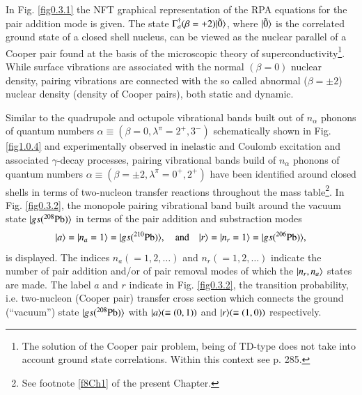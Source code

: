  In Fig. \ref{fig0.3.1} the NFT graphical representation of the RPA equations for the pair addition mode is given. The state $\Gamma^\dagger_a(\beta=+2)|{\tilde 0} \rangle$, where $|{\tilde 0} \rangle$ is the correlated ground state of a closed shell nucleus, can be viewed as the nuclear parallel of a Cooper pair found at the basis of the microscopic theory of superconductivity\footnote{\label{f25Ch1} The solution of the Cooper pair problem, being of TD-type does not take into account ground state correlations. Within this context see \cite{Ambegaokar:69} p. 285.}.
While surface vibrations are associated with the normal $(\beta=0)$ nuclear density, pairing vibrations are connected with the so called abnormal ($\beta=\pm2$) nuclear density (density of Cooper pairs), both static and dynamic.

Similar to the quadrupole and octupole vibrational bands built out of $n_\alpha$ phonons of quantum numbers $\alpha\equiv(\beta=0,\lambda^\pi=2^+,3^-)$ schematically shown in Fig. \ref{fig1.0.4} and experimentally observed in inelastic and Coulomb excitation and associated $\gamma$-decay processes, pairing vibrational bands build of $n_\alpha$ phonons of quantum numbers $\alpha\equiv(\beta=\pm2,\lambda^\pi=0^+,2^+)$ have been identified around closed shells in terms of two-nucleon transfer reactions throughout the mass table\footnote{See footnote \ref{f8Ch1} of the present Chapter.}. In Fig. \ref{fig0.3.2}, the monopole pairing vibrational band built around the vacuum state $|{gs(^{208}\text{Pb})} \rangle$ in terms of the pair addition and substraction modes
\begin{align}\label{eq1.3.9}
|{a} \rangle=|{n_a=1} \rangle=|{gs(^{210}\text{Pb})} \rangle,\quad\text{and}\quad |{r} \rangle=|{n_r=1} \rangle=|{gs(^{206}\text{Pb})} \rangle,
\end{align}
is displayed. The indices $n_a(=1,2,\dots)$ and $n_r(=1,2,\dots)$ indicate the number of pair addition and/or of pair removal modes of which the $|{n_r,n_a} \rangle$ states  are made. The label $a$ and $r$ indicate in Fig. \ref{fig0.3.2}, the  transition probability, i.e. two-nucleon (Cooper pair) transfer cross section which connects the ground (``vacuum'') state $|{gs(^{208}\text{Pb})} \rangle$ with $|{a} \rangle(\equiv(0,1))$ and $|{r} \rangle(\equiv(1,0))$ respectively. 
